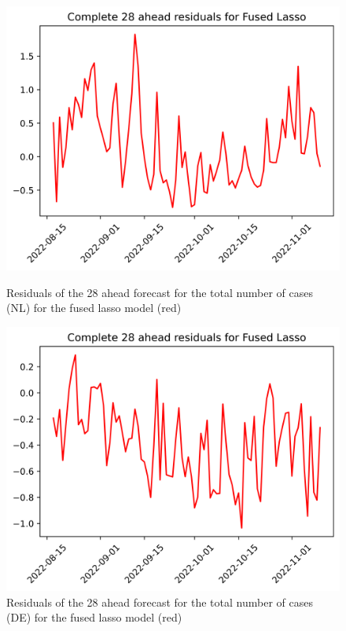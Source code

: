 \begin{figure}

\begin{minipage}{.45\textwidth}
  \centering
  \includegraphics[width=\linewidth]{pics/28_ah/28_ahead_errors_Fused Lasso.png}
  \caption{Residuals of the 28 ahead forecast for the total number of cases (NL) for the fused lasso model (red)}
  \label{fig:tot_cases_error_28_flasso}
\end{minipage}
\begin{minipage}{.45\textwidth}
  \centering
  \includegraphics[width=\linewidth]{pics/28_ah/DE_28_ahead_errors_Fused Lasso.png}
  \caption{Residuals of the 28 ahead forecast for the total number of cases (DE) for the fused lasso model (red)}
  \label{fig:tot_cases_error_28_flasso_DE}
\end{minipage}

\end{figure}
